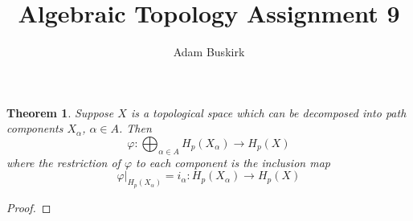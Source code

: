 \documentclass{article}
\title{Algebraic Topology Assignment 9}
\author{Adam Buskirk}
\newtheorem{theorem}{Theorem}
\theoremstyle{definition}
\begin{document}
\maketitle

\begin{theorem}
Suppose $X$ is a topological space which can be decomposed into
path components
$X_\alpha$, $\alpha \in A$. Then 
\[ \varphi : \bigoplus_{\alpha \in A} H_p (X_\alpha) \to H_p (X) \]
where the restriction of $\varphi$ to each component is the inclusion map
\[ \varphi|_{H_p(X_\alpha)} = i_\alpha : H_p(X_\alpha) \to H_p(X) \]

\end{theorem}
\begin{proof}

\end{proof}
\end{document}
